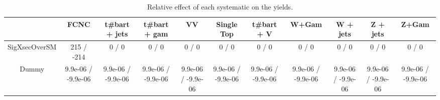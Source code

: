 \begin{table}[htbp]
\begin{center}
\footnotesize
\begin{tabular}{|c|c|c|c|c|c|c|c|c|c|c|}
\hline 
      & FCNC      & t#bar{t} + jets      & t#bar{t} +  gam      & VV      & Single Top      & t#bar{t} + V      & W+Gam      & W + jets      & Z + jets      & Z+Gam \\ 
\hline 
 SigXsecOverSM & 215 / -214 & 0 / 0 & 0 / 0 & 0 / 0 & 0 / 0 & 0 / 0 & 0 / 0 & 0 / 0 & 0 / 0 & 0 / 0 \\ 
  Dummy & 9.9e-06 / -9.9e-06 & 9.9e-06 / -9.9e-06 & 9.9e-06 / -9.9e-06 & 9.9e-06 / -9.9e-06 & 9.9e-06 / -9.9e-06 & 9.9e-06 / -9.9e-06 & 9.9e-06 / -9.9e-06 & 9.9e-06 / -9.9e-06 & 9.9e-06 / -9.9e-06 & 9.9e-06 / -9.9e-06 \\ 
\hline 
\end{tabular} 
\caption{Relative effect of each systematic on the yields.} 
\end{center} 
\end{table} 
